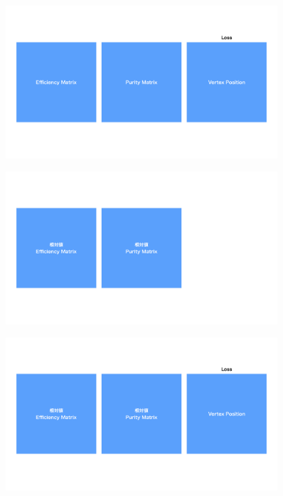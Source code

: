 \begin{figure}[h]
 \centering
   \begin{minipage}{1.0\textwidth}
    \centering
    \includegraphics[trim = 0 220 0 220, width=0.9\textwidth, clip]{Figure/3Networks/3-3-3-2ConfusionMatrixA.png}
    \label{3-3-3-2ConfusionMatrixA}
   \end{minipage}

   \begin{minipage}{1.0\textwidth}
   \centering
    \includegraphics[trim = 0 220 0 220, width=0.9\textwidth, clip]{Figure/3Networks/3-3-3-2ConfusionMatrixB.png}
    \label{3-3-3-2ConfusionMatrixB}
   \end{minipage}
  
  \begin{minipage}{1.0\textwidth}
   \centering
    \includegraphics[trim = 0 220 0 220, width=0.9\textwidth, clip]{Figure/3Networks/3-3-3-2ConfusionMatrixC.png}
    \label{3-3-3-2ConfusionMatrixC}
   \end{minipage}
   

\end{figure}
